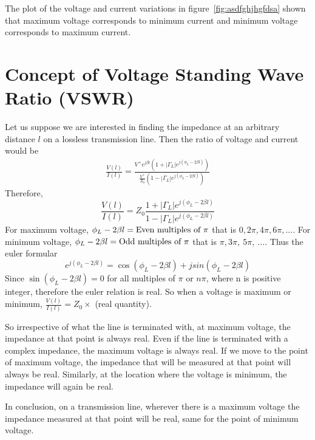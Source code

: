 The plot of the voltage and current variations in figure~\ref{fig:asdfghjhgfdsa} shown that maximum voltage corresponds to minimum current and minimum voltage corresponds to maximum current.

\section{Concept of Voltage Standing Wave Ratio (VSWR)}
Let us suppose we are interested in finding the impedance at an arbitrary distance $l$ on a lossless transmission line. Then the ratio of voltage and current would be
\begin{align*}
\frac{V(l)}{I(l)} = \frac{V^{+}e^{j\beta l}(1+ |\Gamma_L|e^{j(\phi_L- 2 \beta l)})}{\frac{V^{+}}{Z_0}(1- |\Gamma_L|e^{j(\phi_L- 2\beta l)})}
\end{align*}
Therefore,
\begin{equation*}
\frac{V(l)}{I(l)} = Z_0 \frac{1+ |\Gamma_L|e^{j(\phi_L- 2 \beta l)}}{1- |\Gamma_L|e^{j(\phi_L- 2\beta l)}}
\end{equation*}
For maximum voltage, $\phi_L-2\beta l = \textnormal{Even multiples of }\pi$ that is $0, 2\pi, 4\pi, 6\pi,\ldots$. For minimum voltage, $\phi_L-2\beta l=\textnormal{Odd multiples of } \pi$ that is $\pi, 3\pi,\ 5\pi,\ \ldots$. Thus the euler formular 
\[e^{j(\phi_L - 2 \beta l)} = \cos(\phi_L - 2 \beta l) + jsin(\phi_L - 2 \beta l)\]
Since $\sin(\phi_L - 2 \beta l) = 0$ for all multiples of $\pi$ or $n\pi$, where n is positive integer, therefore the euler relation is real. So when a voltage is maximum or minimum, $\frac{V(l)}{I(l)} = Z_0 \times$ (real quantity).

So irrespective of what the line is terminated with, at maximum voltage, the impedance at that point is always real. Even if the line is terminated with a complex impedance, the maximum voltage is always real. If we move to the point of maximum voltage, the impedance that will be measured at that point will always be real. Similarly, at the location where the voltage is minimum, the impedance will again be real.

In conclusion, on a transmission line, wherever there is a maximum voltage the impedance measured at that point will be real, same for the point of minimum voltage.

